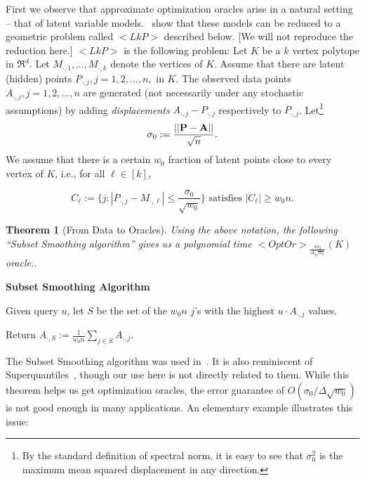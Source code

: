 \documentclass[11pt,letterpaper]{article}
\newcounter{note}[section]
\renewcommand{\thenote}{\thesection.\arabic{note}}
\newcommand{\aknote}[1]{\refstepcounter{note}$\ll${\bf Amit~\thenote:}
  {\sf \color{blue} #1}$\gg$\marginpar{\tiny\bf AK~\thenote}}
\def\mathsf#1{<#1>}%
\def\xspace{}%
\newtheorem{theorem}{Theorem}[section]
\theoremstyle{definition}
\theoremstyle{remark}
\newcommand{\bP}{{\bf P}}
\newcommand{\bA}{{\bf A}}
\newcommand{\lkp}{{\mathsf {LkP}}\xspace}
\newcommand{\olp}{{\mathsf {OLP}}\xspace}
\newcommand{\kolp}{k\mbox{-}\olp}
\newcommand{\Mdot}[1]{{M_{\cdot, #1}}}
\newcommand{\opto}{{\mathsf{OptOr}}}
\begin{document}
First we observe that approximate optimization oracles arise in a 
natural setting -- that of latent variable models.~\cite{BhattacharyyaK20} show that these models can be reduced to a geometric problem called $\lkp$ described below. [We will not reproduce the reduction here.] 
%   
$\lkp$ is the following problem: Let $K$ be a $k$ vertex polytope in $\Re^d$. 
Let $\Mdot{1}, \ldots, \Mdot{k}$ denote the vertices of $K$.  
Assume that there are latent (hidden) points $P_{\cdot ,j}, j=1,2,\ldots ,n,$ in $K$. The observed data points $A_{\cdot,j}, j=1,2,\ldots ,n$ are generated (not necessarily under any stochastic assumptions) by adding {\it displacements} $A_{\cdot,j}-P_{\cdot,j}$ respectively to $P_{\cdot,j}$. Let\footnote{By the standard definition of spectral norm, it is easy to see that $\sigma_0^2$ is the maximum mean squared displacement in any direction.}
$$\sigma_0 :=\frac{||\bP-\bA||}{\sqrt n}.$$
%
We assume that there is a certain $w_0$ fraction of latent points close to every vertex of $K$, i.e., for all $\ell \in [k]$, 

$$  C_\ell :=\{j:|P_{\cdot,j}-M_{\cdot,\ell}|\leq\frac{\sigma_0}{\sqrt{w_0}}\} \mbox{ satisfies    }
|C_\ell|\geq w_0n.$$

\begin{theorem}[From Data to Oracles] \label{subset-smoothing-0}
Using the above notation, the following ``Subset Smoothing  algorithm'' gives us a polynomial time  $\opto_{\frac{4\sigma_0}{\Delta \sqrt{w_0}}}(K)$ oracle..
\end{theorem}

\begin{framed}

{\bf Subset Smoothing Algorithm}

Given query $u$, let $S$ be the set  of the $w_0 n$ $j$'s with the highest $u\cdot A_{\cdot,j}$ values. 

Return 
$A_{\cdot , S}:=\frac{1}{w_0n}\sum_{j\in S} A_{\cdot,j}.$

\end{framed}

The Subset Smoothing algorithm was used in~\cite{BhattacharyyaK20}. It is also reminiscent of Superquantiles~\cite{rockafellar2014random}, though our use here is not directly related to them.
While this theorem helps us get optimization oracles, the error guarantee of $O(\sigma_0/\Delta \sqrt{w_0})$ is not good enough in many applications. An elementary example illustrates this issue:
\end{document}
